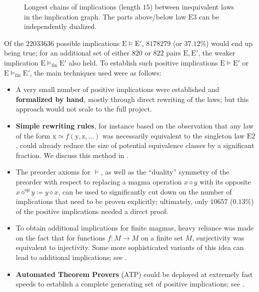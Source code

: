 \documentclass[12pt]{amsart}
\theoremstyle{definition}
\newcommand{\x}{\mathrm{x}}
\newcommand{\y}{\mathrm{y}}
\newcommand{\z}{\mathrm{z}}
\newcommand{\op}{\diamond}
\newcommand{\formaleq}{\simeq}
\newcommand{\modelsfin}{\models_{\mathrm{fin}}}
\newcommand{\Eq}[1]{\mathrm{E}#1}
\newcommand{\E}{\mathrm{E}}
\begin{document}
\begin{figure}
{%
    }
    \caption{Longest chains of implications (length $15$) between inequivalent laws in the implication graph.  The parts above/below law $\Eq{3}$ can be independently dualized. }
    \label{fig:longchain}
\end{figure}

Of the $\num{22033636}$ possible implications ${\E} \models {\E'}$, $\num{8178279}$ (or $37.12\%$) would end up being true; for an additional set of either $820$ or $822$ pairs $\E,{\E'}$, the weaker implication ${\E} \modelsfin {\E'}$ also held. To establish such positive implications ${\E} \models {\E'}$ or ${\E} \modelsfin {\E'}$, the main techniques used were as follows:

\begin{itemize}
    \item A very small number of positive implications were established and \textbf{formalized by hand}, mostly through direct rewriting of the laws; but this approach would not scale to the full project.
    \item \textbf{Simple rewriting rules}, for instance based on the observation that any law of the form $\x \formaleq f(\y,\z,\dots)$ was necessarily equivalent to the singleton law $\Eq{2}$, could already reduce the size of potential equivalence classes by a significant fraction. We discuss this method in .
    \item The preorder axioms for $\models$, as well as the ``duality'' symmetry of the preorder with respect to replacing a magma operation $x \op y$ with its opposite $x \op^{\mathrm{op}} y \coloneqq y \op x$, can be used to significantly cut down on the number of implications that need to be proven explicitly; ultimately, only $\num{10657}$ ($0.13\%$) of the positive implications needed a direct proof.
    \item To obtain additional implications for finite magmas, heavy reliance was made on the fact that for functions $f \colon M \to M$ on a finite set $M$, surjectivity was equivalent to injectivity.  Some more sophisticated variants of this idea can lead to additional implications; see .
    \item \textbf{Automated Theorem Provers} (ATP) could be deployed at extremely fast speeds to establish a complete generating set of positive implications; see .
\end{itemize}
\end{document}
